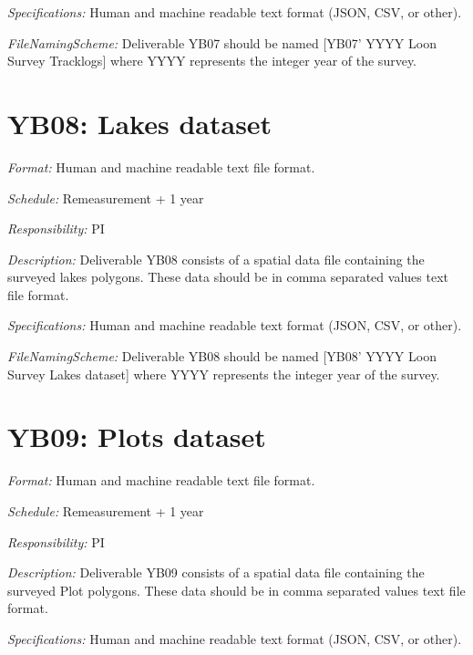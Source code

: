 \documentclass[
  letterpaper,
  DIV=11,
  numbers=noendperiod]{scrreprt}
\begin{document}
\emph{Specifications:} Human and machine readable text format (JSON,
CSV, or other).

\emph{FileNamingScheme:} Deliverable YB07 should be named {[}YB07' YYYY
Loon Survey Tracklogs{]} where YYYY represents the integer year of the
survey.


\chapter*{YB08: Lakes dataset}\label{yb08-lakes-dataset}


\emph{Format:} Human and machine readable text file format.

\emph{Schedule:} Remeasurement + 1 year

\emph{Responsibility:} PI

\emph{Description:} Deliverable YB08 consists of a spatial data file
containing the surveyed lakes polygons. These data should be in comma
separated values text file format.

\emph{Specifications:} Human and machine readable text format (JSON,
CSV, or other).

\emph{FileNamingScheme:} Deliverable YB08 should be named {[}YB08' YYYY
Loon Survey Lakes dataset{]} where YYYY represents the integer year of
the survey.


\chapter*{YB09: Plots dataset}\label{yb09-plots-dataset}


\emph{Format:} Human and machine readable text file format.

\emph{Schedule:} Remeasurement + 1 year

\emph{Responsibility:} PI

\emph{Description:} Deliverable YB09 consists of a spatial data file
containing the surveyed Plot polygons. These data should be in comma
separated values text file format.

\emph{Specifications:} Human and machine readable text format (JSON,
CSV, or other).
\end{document}
